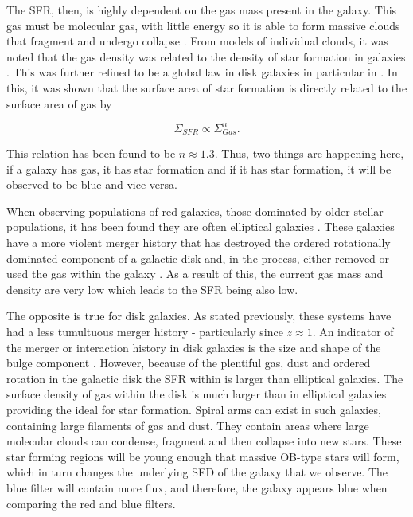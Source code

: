 The SFR, then, is highly dependent on the gas mass present in the galaxy. This gas must be molecular gas, with little energy so it is able to form massive clouds that fragment and undergo collapse \citep{1965MNRAS.130...97G, 1972ApJ...176L...9Q}. From models of individual clouds, it was noted that the gas density was related to the density of star formation in galaxies \citep{1959ApJ...129..243S}. This was further refined to be a global law in disk galaxies in particular in \citet{1998ApJ...498..541K}. In this, it was shown that the surface area of star formation is directly related to the surface area of gas by 

\begin{equation}\label{eq:ks-law}
\Sigma_{SFR} \propto \Sigma_{Gas}^{n}. 
\end{equation}

\noindent This relation has been found to be $n\approx1.3$. Thus, two things are happening here, if a galaxy has gas, it has star formation and if it has star formation, it will be observed to be blue and vice versa.

When observing populations of red galaxies, those dominated by older stellar populations, it has been found they are often elliptical galaxies \citep{1992MNRAS.254..589B}. These galaxies have a more violent merger history that has destroyed the ordered rotationally dominated component of a galactic disk and, in the process, either removed or used the gas within the galaxy \citep{1976ApJ...204..365F}. As a result of this, the current gas mass and density are very low which leads to the SFR being also low.

The opposite is true for disk galaxies. As stated previously, these systems have had a less tumultuous merger history - particularly since $z \approx 1$. An indicator of the merger or interaction history in disk galaxies is the size and shape of the bulge component \citep{2011MNRAS.414..888E}. However, because of the plentiful gas, dust and ordered rotation in the galactic disk the SFR within is larger than elliptical galaxies. The surface density of gas within the disk is much larger than in elliptical galaxies providing the ideal for star formation. Spiral arms can exist in such galaxies, containing large filaments of gas and dust. They contain areas where large molecular clouds can condense, fragment and then collapse into new stars. These star forming regions will be young enough that massive OB-type stars will form, which in turn changes the underlying SED of the galaxy that we observe. The blue filter will contain more flux, and therefore, the galaxy appears blue when comparing the red and blue filters.

